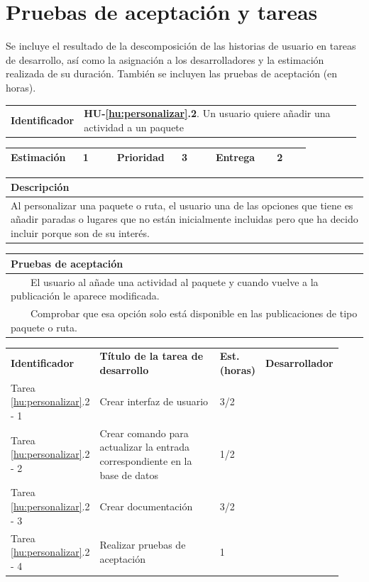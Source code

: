 \documentclass[11pt]{article}
\newcommand{\tabitem}{~~\llap{\textbullet}~~}
\begin{document}
\section{Pruebas de aceptación y tareas}
Se incluye el resultado de la descomposición de las historias de usuario en tareas de desarrollo, así como la asignación a los desarrolladores y la estimación realizada de su duración. También se incluyen las pruebas de aceptación (en horas).


\begin{longtable}{p{0.18\linewidth}|p{0.8\linewidth}}
  \rowcolor{LightCyan}
  \textbf{Identificador} & \textbf{{HU-\ref{hu:personalizar}.2}}. Un usuario quiere añadir una actividad a un paquete \\  
\end{longtable}
\vspace{-0.8cm}
\begin{longtable}{p{0.18\linewidth}|p{0.1\linewidth}|p{0.18\linewidth}|p{0.1\linewidth}|p{0.18\linewidth}|p{0.1\linewidth}}
	\toprule
	\textbf{Estimación} & 1 & \textbf{Prioridad} & 3 & \textbf{Entrega} & 2 \\
	\bottomrule
\end{longtable}
\vspace{-0.8cm}
\begin{longtable}{p{1.028\linewidth}}
	\textbf{Descripción}\\
	\midrule
	Al personalizar una paquete o ruta, el usuario una de las opciones que tiene es añadir paradas o lugares que no están inicialmente incluidas pero que ha decido incluir porque son de su interés. \\
	\bottomrule
\end{longtable}
\vspace{-0.8cm}
\begin{longtable}{p{1.028\linewidth}}
	\textbf{Pruebas de aceptación}\\
	\midrule
	\tabitem El usuario al añade una actividad al paquete y cuando vuelve a la publicación le aparece modificada.\\
	\tabitem Comprobar que esa opción solo está disponible en las publicaciones de tipo paquete o ruta.\\
\end{longtable}
\vspace{-0.8cm}
\begin{longtable}{p{0.18\linewidth}|p{0.48\linewidth}|p{0.1\linewidth}|p{0.17\linewidth}}
  \toprule
  \textbf{Identificador} & \textbf{Título de la tarea de desarrollo} & \textbf{Est. (horas)} & \textbf{Desarrollador} \\
  Tarea \ref{hu:personalizar}.2 - 1 &Crear interfaz de usuario & 3/2 &\\
  Tarea \ref{hu:personalizar}.2 - 2 & Crear comando para  actualizar la entrada correspondiente en la base de datos  & 1/2 & \\
  Tarea \ref{hu:personalizar}.2 - 3 & Crear documentación & 3/2 & \\
  Tarea \ref{hu:personalizar}.2 - 4 & Realizar pruebas de aceptación & 1 &  \\
  \bottomrule
\end{longtable}
\end{document}
